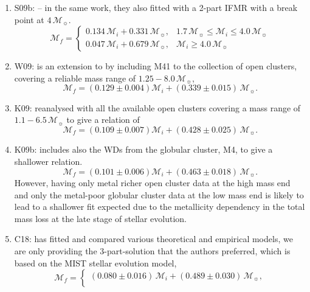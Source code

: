 \documentclass[fleqn,usenatbib]{rasti}
\newcommand{\msun}{\mathcal{M}_{\sun}}
\begin{document}
\begin{enumerate}
    \item S09b: \citet[][two-part]{2009ApJ...692.1013S} -- in the same work, they also fitted with a 2-part IFMR with a break point at $4\,\msun$.
    \begin{equation}
        \mathcal{M}_f = \begin{cases}
                  0.134\,\mathcal{M}_i + 0.331\,\msun, &1.7\,\msun \leq \mathcal{M}_i \leq 4.0\,\msun\\
                  0.047\,\mathcal{M}_i + 0.679\,\msun, &\mathcal{M}_i \geq 4.0\,\msun
              \end{cases}
    \end{equation}
    \item W09: \citet{2009ApJ...693..355W} is an extension to \citet{2009ApJ...692.1013S} by including M41 to the collection of open clusters, covering a reliable mass range of $1.25-8.0\,\msun$,
    \begin{equation}
        \mathcal{M}_f = (0.129 \pm 0.004) \mathcal{M}_i + (0.339 \pm 0.015)\,\msun.
    \end{equation}
    \item K09: \citet{2009ApJ...705..408K} reanalysed with all the available open clusters covering a mass range of $1.1-6.5\,\msun$ to give a relation of
    \begin{equation}
        \mathcal{M}_f = (0.109 \pm 0.007) \mathcal{M}_i + (0.428 \pm 0.025)\,\msun.
    \end{equation}
    \item K09b: \citet[][extended]{2009ApJ...705..408K} includes also the WDs from the globular cluster, M4, to give a shallower relation.
    \begin{equation}
        \mathcal{M}_f = (0.101 \pm 0.006) \mathcal{M}_i + (0.463 \pm 0.018)\,\msun.
    \end{equation}
    However, having only metal richer open cluster data at the high mass end and only the metal-poor globular cluster data at the low mass end is likely to lead to a shallower fit expected due to the metallicity dependency in the total mass loss at the late stage of stellar evolution.
    \item C18: \citet{2018ApJ...866...21C} has fitted and compared various theoretical and empirical models, we are only providing the 3-part-solution that the authors preferred, which is based on the MIST stellar evolution model,
    \begin{equation}
        \mathcal{M}_f = \begin{cases}
                  (0.080 \pm 0.016)\,\mathcal{M}_i + (0.489 \pm 0.030)\,\msun,\\

\end{cases}
\end{equation}
\end{enumerate}
\end{document}
